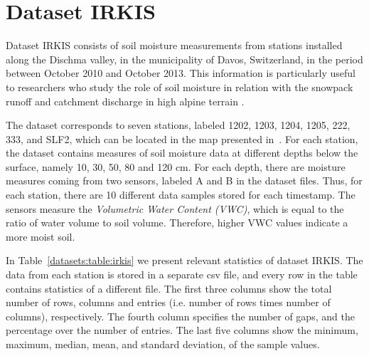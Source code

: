 
\section{Dataset IRKIS}
\label{datasets:irkis}


Dataset IRKIS \cite{dataset:irkis} consists of soil moisture measurements from stations installed along the Dischma valley, in the municipality of Davos, Switzerland, in the period between October 2010 and October 2013. This information is particularly useful to researchers who study the role of soil moisture in relation with the snowpack runoff and catchment discharge in high alpine terrain \cite{dataset:irkis2}. 


The dataset corresponds to seven stations, labeled 1202, 1203, 1204, 1205, 222, 333, and SLF2, which can be located in the map presented in~\cite{dataset:irkis}. For each station, the dataset contains measures of soil moisture data at different depths below the surface, namely 10, 30, 50, 80 and 120 cm. For each depth, there are moisture measures coming from two sensors, labeled A and B in the dataset files. Thus, for each station, there are 10 different data samples stored for each timestamp. The sensors measure the \textit{Volumetric Water Content (VWC)}, which is equal to the ratio of water volume to soil volume. Therefore, higher VWC values indicate a more moist soil. 


In Table~\ref{datasets:table:irkis} we present relevant statistics of dataset IRKIS. The data from each station is stored in a separate csv file, and every row in the table contains statistics of a different file. The first three columns show the total number of rows, columns and entries (i.e. number of rows times number of columns), respectively. The fourth column specifies the number of gaps, and the percentage over the number of entries. The last five columns show the minimum, maximum, median, mean, and standard deviation, of the sample values.




